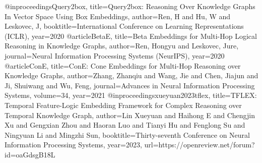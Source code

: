 @inproceedings{Query2box,
  title={Query2box: Reasoning Over Knowledge Graphs In Vector Space Using Box Embeddings},
  author={Ren, H and Hu, W and Leskovec, J},
  booktitle={International Conference on Learning Representations (ICLR)},
  year={2020}
}
@article{BetaE,
  title={Beta Embeddings for Multi-Hop Logical Reasoning in Knowledge Graphs},
  author={Ren, Hongyu and Leskovec, Jure},
  journal={Neural Information Processing Systems (NeurIPS)},
  year={2020}
}
@article{ConE,
  title={ConE: Cone Embeddings for Multi-Hop Reasoning over Knowledge Graphs},
  author={Zhang, Zhanqiu and Wang, Jie and Chen, Jiajun and Ji, Shuiwang and Wu, Feng},
  journal={Advances in Neural Information Processing Systems},
  volume={34},
  year={2021}
}
@inproceedings{xueyuan2023tflex,
  title={{TFLEX}: Temporal Feature-Logic Embedding Framework for Complex Reasoning over Temporal Knowledge Graph},
  author={Lin Xueyuan and Haihong E and Chengjin Xu and Gengxian Zhou and Haoran Luo and Tianyi Hu and Fenglong Su and Ningyuan Li and Mingzhi Sun},
  booktitle={Thirty-seventh Conference on Neural Information Processing Systems},
  year={2023},
  url={https://openreview.net/forum?id=oaGdsgB18L}
}